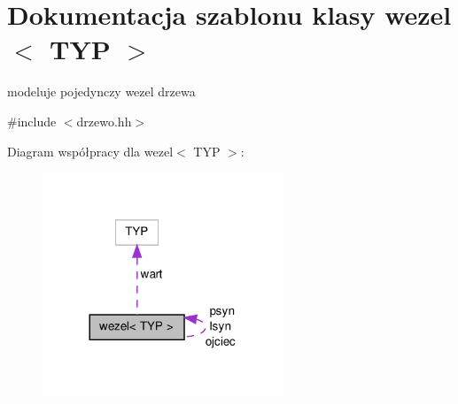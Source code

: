 \hypertarget{classwezel}{\section{\-Dokumentacja szablonu klasy wezel$<$ \-T\-Y\-P $>$}
\label{classwezel}
}


modeluje pojedynczy wezel drzewa  




{\ttfamily \#include $<$drzewo.\-hh$>$}



\-Diagram współpracy dla wezel$<$ \-T\-Y\-P $>$\-:\nopagebreak
\begin{figure}[H]
\begin{center}
\leavevmode
\includegraphics[width=204pt]{classwezel__coll__graph}
\end{center}
\end{figure}
